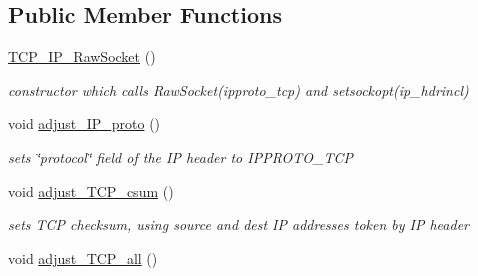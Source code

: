 \subsection*{Public Member Functions}
\begin{CompactItemize}
\item 
\hypertarget{classsocketpp_1_1TCP__IP__RawSocket_1b08f12274fd9590f805bc876c44edd9}{
\hyperlink{classsocketpp_1_1TCP__IP__RawSocket_1b08f12274fd9590f805bc876c44edd9}{TCP\_\-IP\_\-RawSocket} ()}
\label{classsocketpp_1_1TCP__IP__RawSocket_1b08f12274fd9590f805bc876c44edd9}

\begin{CompactList}\small\item\em constructor which calls RawSocket(ipproto\_\-tcp) and setsockopt(ip\_\-hdrincl) \item\end{CompactList}\item 
\hypertarget{classsocketpp_1_1TCP__IP__RawSocket_1f7408daf2943c00f051db544d0034c8}{
void \hyperlink{classsocketpp_1_1TCP__IP__RawSocket_1f7408daf2943c00f051db544d0034c8}{adjust\_\-IP\_\-proto} ()}
\label{classsocketpp_1_1TCP__IP__RawSocket_1f7408daf2943c00f051db544d0034c8}

\begin{CompactList}\small\item\em sets \char`\"{}protocol\char`\"{} field of the IP header to IPPROTO\_\-TCP \item\end{CompactList}\item 
\hypertarget{classsocketpp_1_1TCP__IP__RawSocket_c203b188308532333bdf53a4e18bc230}{
void \hyperlink{classsocketpp_1_1TCP__IP__RawSocket_c203b188308532333bdf53a4e18bc230}{adjust\_\-TCP\_\-csum} ()}
\label{classsocketpp_1_1TCP__IP__RawSocket_c203b188308532333bdf53a4e18bc230}

\begin{CompactList}\small\item\em sets TCP checksum, using source and dest IP addresses token by IP header \item\end{CompactList}\item 
\hypertarget{classsocketpp_1_1TCP__IP__RawSocket_3644327ff72d322ff809ac432f59783b}{
void \hyperlink{classsocketpp_1_1TCP__IP__RawSocket_3644327ff72d322ff809ac432f59783b}{adjust\_\-TCP\_\-all} ()}
\label{classsocketpp_1_1TCP__IP__RawSocket_3644327ff72d322ff809ac432f59783b}


\end{CompactItemize}
